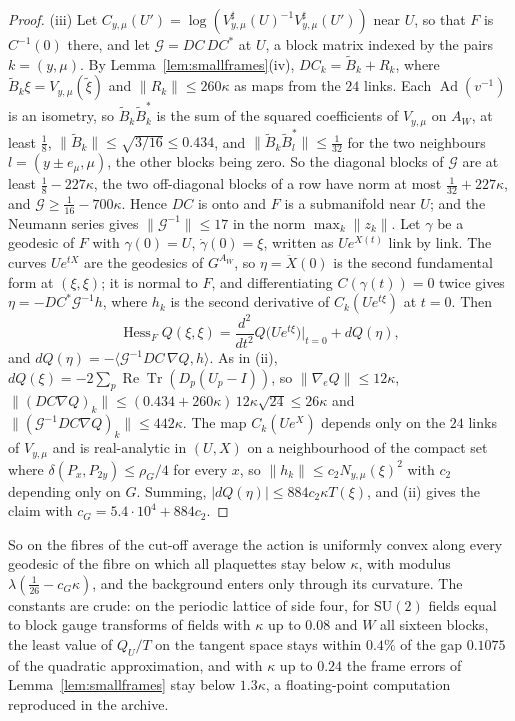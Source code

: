 \documentclass[11pt]{amsart}
\theoremstyle{definition}
\theoremstyle{remark}
\numberwithin{equation}{section}
\newcommand{\SU}{\mathrm{SU}}
\newcommand{\ReTr}{\operatorname{Re}\operatorname{Tr}}
\newcommand{\Hess}{\operatorname{Hess}}
\begin{document}
\begin{proof}
(iii) Let $C_{y,\mu}(U')=\log(V^\sharp_{y,\mu}(U)^{-1}V^\sharp_{y,\mu}(U'))$
near $U$, so that $F$ is $C^{-1}(0)$ there, and let $\mathcal G=DC\,DC^*$
at $U$, a block matrix indexed by the pairs $k=(y,\mu)$. By
Lemma~\ref{lem:smallframes}(iv), $DC_k=\tilde B_k+R_k$, where $\tilde B_k
\xi=V_{y,\mu}(\tilde\xi)$ and $\lVert R_k\rVert\le260\kappa$ as maps from
the $24$ links. Each $\operatorname{Ad}(v^{-1})$ is an isometry, so $\tilde
B_k\tilde B_k^*$ is the sum of the squared coefficients of $V_{y,\mu}$ on
$A_W$, at least $\frac18$, $\lVert\tilde B_k\rVert\le\sqrt{3/16}\le0.434$,
and $\lVert\tilde B_k\tilde B_l^*\rVert\le\frac1{32}$ for the two
neighbours $l=(y\pm e_\mu,\mu)$, the other blocks being zero. So the
diagonal blocks of $\mathcal G$ are at least $\frac18-227\kappa$, the two
off-diagonal blocks of a row have norm at most $\frac1{32}+227\kappa$, and
$\mathcal G\ge\frac1{16}-700\kappa$. Hence $DC$ is onto and $F$ is a
submanifold near $U$; and the Neumann series gives $\lVert\mathcal G^{-1}
\rVert\le17$ in the norm $\max_k\lVert z_k\rVert$. Let $\gamma$ be a
geodesic of $F$ with $\gamma(0)=U$, $\dot\gamma(0)=\xi$, written as $U
e^{X(t)}$ link by link. The curves $Ue^{tX}$ are the geodesics of
$G^{A_W}$, so $\eta=\ddot X(0)$ is the second fundamental form at $(\xi,
\xi)$; it is normal to $F$, and differentiating $C(\gamma(t))=0$ twice
gives $\eta=-DC^*\mathcal G^{-1}h$, where $h_k$ is the second derivative of
$C_k(Ue^{t\xi})$ at $t=0$. Then
\[
\Hess_FQ(\xi,\xi)=\frac{d^2}{dt^2}Q\bigl(Ue^{t\xi}\bigr)\Big|_{t=0}+dQ(\eta),
\]
and $dQ(\eta)=-\langle\mathcal G^{-1}DC\,\nabla Q,h\rangle$.
As in (ii), $dQ(\xi)=-2\sum_p\ReTr(D_p(U_p-I))$, so $\lVert\nabla_eQ\rVert
\le12\kappa$, $\lVert(DC\nabla Q)_k\rVert\le(0.434+260\kappa)\,12\kappa\sqrt{24}\le
26\kappa$ and $\lVert(\mathcal G^{-1}DC\nabla Q)_k\rVert\le442\kappa$. The
map $C_k(Ue^{X})$ depends only on the $24$ links of $V_{y,\mu}$ and is
real-analytic in $(U,X)$ on a neighbourhood of the compact set where
$\delta(P_x,P_{2y})\le\rho_G/4$ for every $x$, so $\lVert h_k\rVert\le c_2
N_{y,\mu}(\xi)^2$ with $c_2$ depending only on $G$. Summing,
$|dQ(\eta)|\le884c_2\kappa T(\xi)$, and (ii) gives the claim with $c_G=5.4
\cdot10^4+884c_2$.
\end{proof}

So on the fibres of the cut-off average the action is uniformly convex along
every geodesic of the fibre on which all plaquettes stay below $\kappa$, with
modulus $\lambda(\frac1{26}-c_G\kappa)$, and the background enters only
through its curvature. The constants are crude: on the periodic lattice of
side four, for $\SU(2)$ fields equal to block gauge transforms of fields
with $\kappa$ up to $0.08$ and $W$ all sixteen blocks, the least value of
$Q_U/T$ on the tangent space stays within $0.4\%$ of the gap $0.1075$ of the
quadratic approximation, and with $\kappa$ up to $0.24$ the frame errors of
Lemma~\ref{lem:smallframes} stay below $1.3\kappa$, a floating-point
computation reproduced in the archive.
\end{document}
